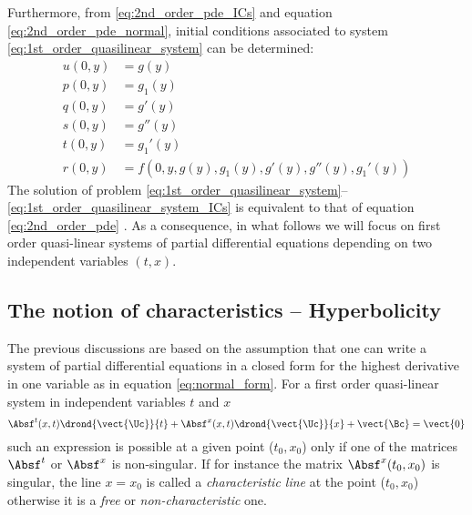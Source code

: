 Furthermore, from \eqref{eq:2nd_order_pde_ICs} and equation \eqref{eq:2nd_order_pde_normal}, initial conditions associated to system \eqref{eq:1st_order_quasilinear_system} can be determined:
\begin{equation}
  \label{eq:1st_order_quasilinear_system_ICs}
  \begin{aligned}
    u(0,y) &= g(y)\\
    p(0,y) &= g_1(y) \\
    q(0,y) &= g'(y) \\
    s(0,y) &= g''(y) \\
    t(0,y) &= g_1'(y) \\
    r(0,y) &= f(0,y,g(y),g_1(y),g'(y),g''(y),g_1'(y))
  \end{aligned}
\end{equation}
The solution of problem \eqref{eq:1st_order_quasilinear_system}--\eqref{eq:1st_order_quasilinear_system_ICs}  is equivalent to that of equation \eqref{eq:2nd_order_pde} \cite{Courant}.
As a consequence, in what follows we will focus on first order quasi-linear systems of partial differential equations depending on two independent variables $(t,x)$.
\subsection{The notion of characteristics -- Hyperbolicity}
The previous discussions are based on the assumption that one can write a system of partial differential equations in a closed form for the highest derivative in one variable as in equation \eqref{eq:normal_form}. For a first order quasi-linear system in independent variables $t$ and $x$
\begin{equation}
  \label{eq:1st_order_quasilinear_syst}
  \Absf^t(x,t)\drond{\vect{\Uc}}{t} + \Absf^x(x,t) \drond{\vect{\Uc}}{x} + \vect{\Bc} = \vect{0}
\end{equation}
such an expression is possible at a given point ($t_0,x_0$) only if one of the matrices $\Absf^t$ or $\Absf^x$ is non-singular. If for instance the matrix $\Absf^x(t_0,x_0)$ is singular, the line $x=x_0$ is called a \textit{characteristic line} at the point ($t_0,x_0$) otherwise it is a \textit{free} or \textit{non-characteristic} one.

